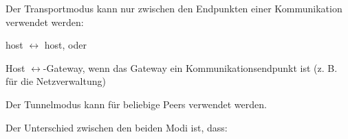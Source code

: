 \documentclass[a4paper]{article}
\begin{document}
\begin{multicols}{3}
\begin{itemize*}
            \begin{itemize*}
                  \item Der Transportmodus kann nur zwischen den Endpunkten einer Kommunikation verwendet werden:
                  \begin{itemize*}
                        \item host $\leftrightarrow$ host, oder
                        \item Host $\leftrightarrow$-Gateway, wenn das Gateway ein Kommunikationsendpunkt ist (z. B. für die Netzverwaltung)
                  \end{itemize*}
                  \item Der Tunnelmodus kann für beliebige Peers verwendet werden.
            \end{itemize*}
      \end{itemize*}

      Der Unterschied zwischen den beiden Modi ist, dass:


\end{multicols}
\end{document}
